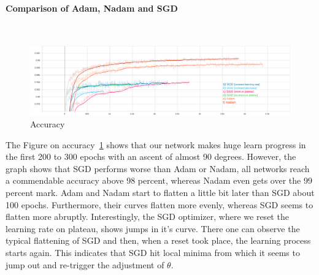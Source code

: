 
%






\paragraph{Comparison of Adam, Nadam and SGD}\mbox{}\\
\begin{figure}[H]
    \centering
    \includegraphics[width=\textwidth,height=\textheight,keepaspectratio]{img/accuracy_all.png}
    \decoRule
    \caption[Accuracy]{Accuracy}
    \label{fig:accuracy}
\end{figure}

The Figure on accuracy~\ref{fig:accuracy} shows that our network makes huge learn progress in the first
200 to 300 epochs with an ascent of almost 90 degrees.
However, the graph shows that SGD performs worse than Adam or Nadam, all networks reach a commendable accuracy above
98 percent, whereas Nadam even gets over the 99 percent mark.
Adam and Nadam start to flatten a little bit later than SGD about 100 epochs.
Furthermore, their curves flatten more evenly, whereas SGD
seems to flatten more abruptly.
Interestingly, the SGD optimizer, where we reset the learning rate on plateau, shows jumps in it's curve.
There one can observe the typical flattening of SGD and then, when a reset took place, the learning process starts again.
This indicates that SGD hit local minima from which it seems to jump out and re-trigger the adjustment of $\theta$.




